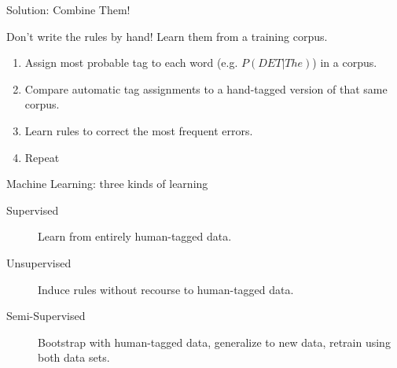 \documentclass[9pt,xcolor=pdftex,dvipsnames,table]{beamer}
\begin{document}
\begin{frame}{Solution: Combine Them!}

	\begin{center}
		{\large Don't write the rules by hand!  Learn them from a training corpus.}
	\end{center}
	\vspace{.5cm}
	\begin{enumerate}
		\item Assign most probable tag to each word (e.g. $P(DET|The)$) in a corpus.
		\item Compare automatic tag assignments to a hand-tagged version of that same corpus.
		\item Learn rules to correct the most frequent errors.
		\item Repeat 
	\end{enumerate}
\end{frame}

\begin{frame}{Machine Learning: three kinds of learning}

	\begin{description}
		\item[Supervised] Learn from entirely human-tagged data.
		\item[Unsupervised] Induce rules without recourse to human-tagged data.
		\item[Semi-Supervised] Bootstrap with human-tagged data, generalize to new data, retrain using both data sets.
	\end{description}
\end{frame}
\end{document}
